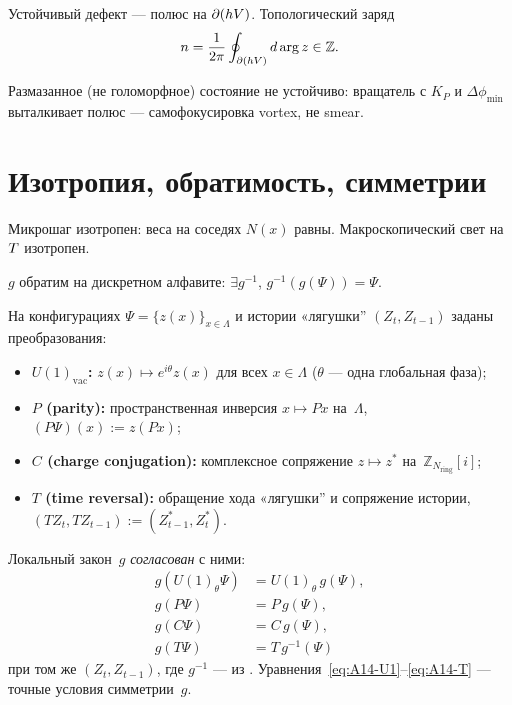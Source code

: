 \begin{axiom}
\label{ax:A10}
Устойчивый дефект --- полюс на $\partial(hV)$. Топологический заряд
\[
  n=\frac{1}{2\pi}\oint_{\partial(hV)} d\arg z \in \mathbb{Z}.
\]
\end{axiom}

\begin{axiom}
\label{ax:A11}
Размазанное (не голоморфное) состояние не устойчиво: вращатель с $K_P$ и $\Delta\phi_{\min}$
выталкивает полюс --- самофокусировка vortex, не smear.
\end{axiom}

\section{Изотропия, обратимость, симметрии}

\begin{axiom}
\label{ax:A12}
Микрошаг изотропен: веса на соседях $N(x)$ равны.
Макроскопический свет на~$T$ изотропен.
\end{axiom}

\begin{axiom}
\label{ax:A13}
$g$ обратим на дискретном алфавите: $\exists g^{-1}$, $g^{-1}(g(\Psi))=\Psi$.

\end{axiom}

\begin{axiom}
\label{ax:A14}
На конфигурациях $\Psi=\{z(x)\}_{x\in\Lambda}$ и истории «лягушки'' $(Z_t,Z_{t-1})$
заданы преобразования:
\begin{itemize}[nosep]
\item \textbf{$U(1)_{\mathrm{vac}}$:} $z(x)\mapsto e^{i\theta}z(x)$ для всех $x\in\Lambda$
      ($\theta$ --- одна глобальная фаза);
\item \textbf{$P$ (parity):} пространственная инверсия $x\mapsto Px$ на~$\Lambda$,
      $(P\Psi)(x):=z(Px)$;
\item \textbf{$C$ (charge conjugation):} комплексное сопряжение $z\mapsto z^*$
      на~$\mathbb{Z}_{N_{\mathrm{ring}}}[i]$;
\item \textbf{$T$ (time reversal):} обращение хода «лягушки'' и сопряжение истории,
      $(TZ_t,TZ_{t-1}):=(Z_{t-1}^*,Z_t^*)$.
\end{itemize}
Локальный закон~$g$ \emph{согласован} с ними:
\begin{align}
  g(U(1)_\theta\Psi) &= U(1)_\theta\,g(\Psi), \label{eq:A14-U1}\\
  g(P\Psi) &= P\,g(\Psi), \label{eq:A14-P}\\
  g(C\Psi) &= C\,g(\Psi), \label{eq:A14-C}\\
  g(T\Psi) &= T\,g^{-1}(\Psi) \label{eq:A14-T}
\end{align}
при том же $(Z_t,Z_{t-1})$, где $g^{-1}$ --- из .
Уравнения~\eqref{eq:A14-U1}--\eqref{eq:A14-T} --- точные условия симметрии~$g$.
\end{axiom}

